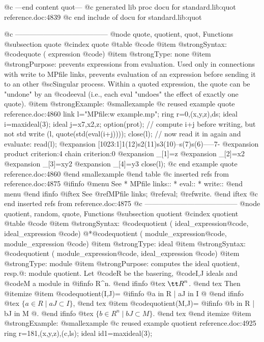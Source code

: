 {{{{{{@c ---end content quot---
@c generated lib proc docu for standard.lib:quot reference.doc:4839 
@c end include of docu for standard.lib:quot


@c ---------------------------------------
@node quote, quotient, quot, Functions
@subsection quote
@cindex quote
@table @code
@item @strong{Syntax:}
@code{quote (} expression @code{)}
@item @strong{Type:}
none
@item @strong{Purpose:}
prevents expressions from evaluation. Used only in connections with write to
MPfile links, prevents evaluation of an expression before sending it to an other
@sc{Singular} process.
Within a quoted expression, the
quote can be "undone" by an @code{eval} (i.e., each eval "undoes" the
effect of exactly one quote).
@item @strong{Example:}
@smallexample
@c reused example quote reference.doc:4860 
  link l="MPfile:w example.mp";
  ring r=0,(x,y,z),ds;
  ideal i=maxideal(3);
  ideal j=x7,x2,z;
  option(prot);
  // compute i+j before writing, but not std
  write (l, quote(std(eval(i+j))));
  close(l);
  // now read it in again and evaluate:
  read(l);
@expansion{} [1023:1]1(12)s2(11)s3(10)--s(7)s(6)-----7-
@expansion{} product criterion:4 chain criterion:0
@expansion{} _[1]=z
@expansion{} _[2]=x2
@expansion{} _[3]=xy2
@expansion{} _[4]=y3
  close(l);
@c end example quote reference.doc:4860
@end smallexample
@end table
@c inserted refs from reference.doc:4875
@ifinfo
@menu
See
* MPfile links::
* eval::
* write::
@end menu
@end ifinfo
@iftex
See
@ref{MPfile links};
@ref{eval};
@ref{write}.
@end iftex
@c end inserted refs from reference.doc:4875
@c ---------------------------------------
@node quotient, random, quote, Functions
@subsection quotient
@cindex quotient
@table @code
@item @strong{Syntax:}
@code{quotient (} ideal_expression@code{,} ideal_expression @code{)}
@*@code{quotient (} module_expression@code{,} module_expression @code{)}
@item @strong{Type:}
ideal
@item @strong{Syntax:}
@code{quotient (} module_expression@code{,} ideal_expression @code{)}
@item @strong{Type:}
module
@item @strong{Purpose:}
computes the ideal quotient, resp.@: module quotient. Let @code{R} be the
basering, @code{I,J} ideals and @code{M} a module in
@ifinfo
R^n.
@end ifinfo
@tex
${\tt R}^n$.
@end tex
Then
@itemize
@item
@code{quotient(I,J)}=
@ifinfo
@{a in R | aJ in I @}
@end ifinfo
@tex
$\{a \in R \mid aJ \subset I\}$,
@end tex
@item
@code{quotient(M,J)}=
@ifinfo
@{b in R | bJ in M @}.
@end ifinfo
@tex
$\{b \in R^n \mid bJ \subset M\}$.
@end tex
@end itemize
@item @strong{Example:}
@smallexample
@c reused example quotient reference.doc:4925 
ring r=181,(x,y,z),(c,ls);
ideal id1=maxideal(3);
}}}}}}
